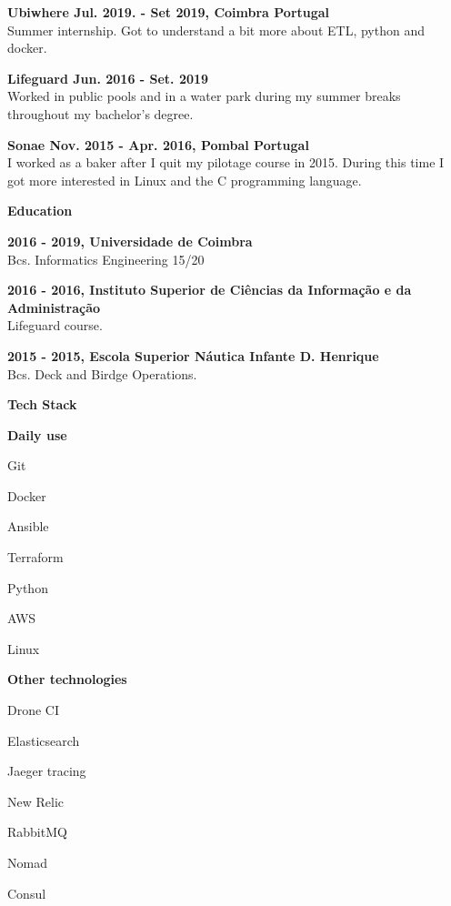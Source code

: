 \documentclass[a4paper,12pt,final]{memoir}
\newcommand{\Sep}{\vspace{1.5em}}
\newcommand{\SmallSep}{\vspace{0.5em}}
\newcommand{\CVSection}[1]
	{\Large\textbf{#1}\par
	\SmallSep\normalsize\normalfont}
\newcommand{\CVItem}[1]
	{\textbf{\color{RoyalBlue} #1}}
\begin{document}
\CVItem{Ubiwhere Jul. 2019. - Set 2019, Coimbra Portugal}\\
Summer internship. Got to understand a bit more about ETL, python and docker. 
\SmallSep

\CVItem{Lifeguard Jun. 2016 - Set. 2019}\\
Worked in public pools and in a water park during my summer breaks throughout my bachelor's degree.
\SmallSep

\CVItem{Sonae Nov. 2015 - Apr. 2016, Pombal Portugal}\\
I worked as a baker after I quit my pilotage course in 2015. During this time I got more interested in Linux and the C programming language.
\SmallSep


\Sep

\CVSection{Education}
\CVItem{2016 - 2019, Universidade de Coimbra}\\
Bcs. Informatics Engineering 15/20
\SmallSep

\CVItem{2016 - 2016, Instituto Superior de Ciências da Informação e da Administração}\\
Lifeguard course.
\SmallSep

\CVItem{2015 - 2015, Escola Superior Náutica Infante D. Henrique
}\\
Bcs. Deck and Birdge Operations.
\SmallSep


\CVSection{Tech Stack}

\CVItem{Daily use}
\begin{multicols}{3}
\begin{compactitem}[\color{RoyalBlue}$\circ$]
	\item Git
	\item Docker
	\item Ansible
	\item Terraform
	\item Python
	\item AWS
	\item Linux
\end{compactitem}
\end{multicols}
\Sep 

\CVItem{Other technologies}
\begin{multicols}{3}
\begin{compactitem}[\color{RoyalBlue}$\circ$]
	\item Drone CI
	\item Elasticsearch
	\item Jaeger tracing
	\item New Relic
	\item RabbitMQ
	\item Nomad
	\item Consul
\end{compactitem}
\end{multicols}
\Sep 
\end{document}
